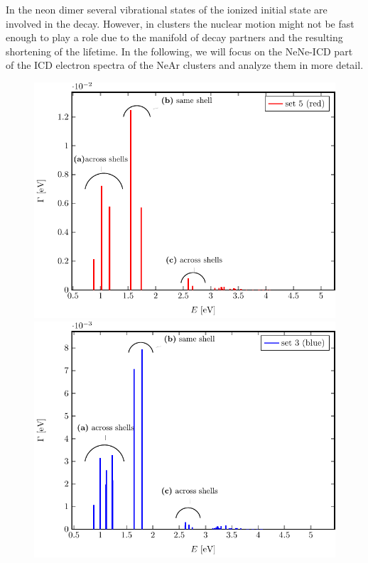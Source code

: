In the neon dimer several vibrational states of the ionized initial state are
involved in the decay. \cite{Santra00_1} However, in clusters the nuclear
motion might not be fast enough to play a role due to the manifold of
decay partners and the resulting shortening of the lifetime.
In the following, we will focus on the NeNe-ICD part of the
ICD electron spectra of the NeAr clusters and analyze them in more detail.

\begin{figure}[h]
 \centering
 \includegraphics[width=\columnwidth]{pics/rot.pdf}\\
 \includegraphics[width=\columnwidth]{pics/blue.pdf}

\end{figure}
